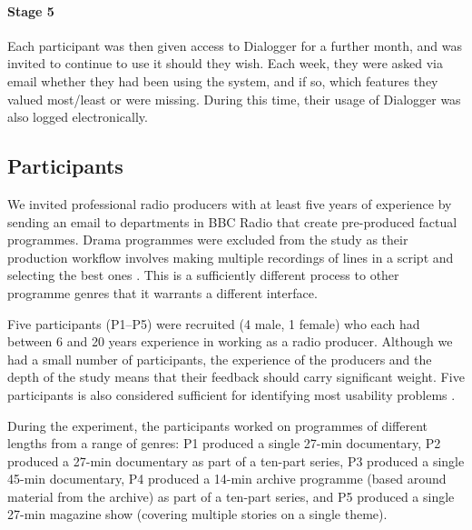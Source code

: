 
\paragraph{Stage 5}
    Each participant was then given access to Dialogger 
    for a further month, and was invited to continue to use it should they
    wish. Each week, they were asked via email whether they had been using the
    system, and if so, which features they valued most/least or were missing.
    During this time, their usage of Dialogger was also logged electronically.

\subsection{Participants}
We invited professional radio producers with at least five years of experience
by sending an email to departments in BBC Radio that create pre-produced
factual programmes.  Drama programmes were excluded from the study as their
production workflow involves making multiple recordings of lines in a script
and selecting the best ones \citep{Baume2015}. This is a sufficiently different
process to other programme genres that it warrants a different interface.

Five participants (P1--P5) were recruited (4 male, 1 female) who each had
between 6 and 20 years experience in working as a radio producer. Although we
had a small number of participants, the experience of the
producers and the depth of the study means that their feedback should carry
significant weight. Five participants is also considered sufficient for
identifying most usability problems \citep{Nielsen1993}.

During the experiment, the participants worked on programmes of different
lengths from a range of genres:
P1 produced a single 27-min documentary, %
P2 produced a 27-min documentary as part of a ten-part series,
P3 produced a single 45-min documentary,
P4 produced a 14-min archive programme
(based around material from the archive) as part of a ten-part series, and
P5 produced a single 27-min magazine show (covering multiple stories on a
single theme).

